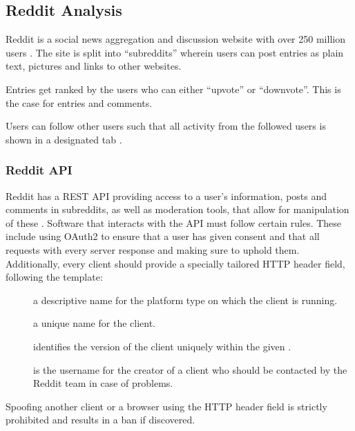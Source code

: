 \subsection{Reddit Analysis}\label{sec:reddit-analysis}
Reddit is a social news aggregation and discussion website with over 250 million
users \citep{AdvertiseOnReddit}. The site is split into ``subreddits'' wherein
users can post entries as plain text, pictures and links to other websites. \nl

Entries get ranked by the users who can either ``upvote'' or ``downvote''. This
is the case for entries and comments. \citep{AboutReddit}\nl

Users can follow other users such that all activity from the followed users is
shown in a designated tab .

\subsubsection{Reddit API}\label{subsec:reddit-api}
Reddit has a \ac{REST} \ac{API} providing access to a user's information, posts
and comments in subreddits, as well as moderation tools, that allow for
manipulation of these \citep{RedditApi}. Software that interacts with the
\ac{API} must follow certain rules. These include using OAuth2 to ensure that a
user has given consent and that all requests  with every server response and making sure to uphold them.
Additionally, every client should provide a specially tailored 
\ac{HTTP} header field, following the template: \citep{RedditApiRules}\nl

\begin{center}
\end{center}\nl
\begin{description}
  \item[] a descriptive name for the platform type on which the
  client is running.
  \item[] a unique name for the client.
  \item[] identifies the version of the client uniquely
  within the given .
  \item[] is the username for the creator of a client who
  should be contacted by the Reddit team in case of problems.
\end{description}\nl

Spoofing another client or a browser using the  \ac{HTTP} header field is strictly prohibited and
results in a ban if discovered. \citep{RedditApiRules}\nl